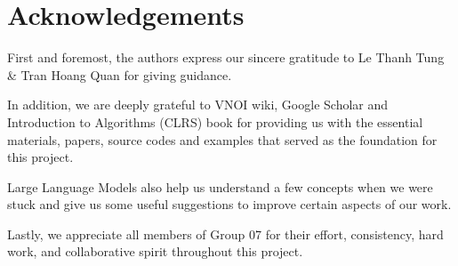 \section{Acknowledgements}

    First and foremost, the authors express our sincere gratitude to Le Thanh Tung \& Tran Hoang Quan for giving guidance.
    
    \indent In addition, we are deeply grateful to VNOI wiki, Google Scholar and Introduction to Algorithms (CLRS) book for providing us with the essential materials, papers, source codes and examples that served as the foundation for this project.
    
    \indent Large Language Models also help us understand a few concepts when we were stuck and give us some useful suggestions to improve certain aspects of our work.
    
    \indent Lastly, we appreciate all members of Group 07 for their effort, consistency, hard work, and collaborative spirit throughout this project.



